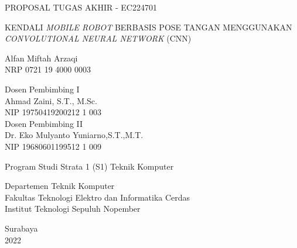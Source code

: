 \begin{large}
  PROPOSAL TUGAS AKHIR - EC224701
\end{large}

\vspace{\fill}

\begin{spacing}{1.5}
  \begin{Large}
    KENDALI \textit{MOBILE ROBOT} BERBASIS POSE TANGAN MENGGUNAKAN \textit{CONVOLUTIONAL NEURAL NETWORK} (CNN)
  \end{Large}
\end{spacing}

\vspace{\fill}

\begin{large}
  Alfan Miftah Arzaqi \\
  \textnormal{NRP 0721 19 4000 0003}
\end{large}

\vspace{\fill}

\begin{large}
  \textnormal{Dosen Pembimbing I} \\
  Ahmad Zaini, S.T., M.Sc. \\
  \textnormal{NIP 19750419200212 1 003} \\
  \textnormal{Dosen Pembimbing II} \\
  Dr. Eko Mulyanto Yuniarno,S.T.,M.T. \\
  \textnormal{NIP 19680601199512 1 009}
\end{large}

\vspace{\fill}

Program Studi Strata 1 (S1) Teknik Komputer \\

\normalfont

Departemen Teknik Komputer \\
Fakultas Teknologi Elektro dan Informatika Cerdas \\
Institut Teknologi Sepuluh Nopember

Surabaya \\
2022
